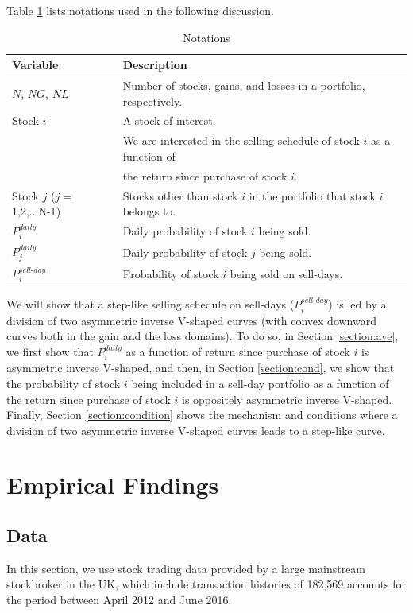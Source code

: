 \documentclass[11pt, a4paper]{article}
\begin{document}
Table \ref{table:notations} lists notations used in the following discussion.

\begin{table}[H]
	\label{table:notations}
	\caption{Notations}
	\centering
	\small
	\begin{tabular}{l l} 
		\hline
		Variable &\:\:\:\:\:\:\:\:\:\:\:\: Description \\
		\hline
		$N$, $NG$, $NL$ & Number of stocks, gains, and losses in a portfolio, respectively.\\
		Stock $i$ & A stock of interest. \\
		& We are interested in the selling schedule of stock $i$ as a function of\\
		& the return since purchase of stock $i$.\\
		Stock $j$ ($j=${1,2,...N-1})& Stocks other than stock $i$ in the portfolio that stock $i$ belongs to.\\
		$P^{daily}_{i}$ & Daily probability of stock $i$ being sold. \\
		$P^{daily}_{j}$ & Daily probability of stock $j$ being sold. \\
		$P^{sell\mbox{-}day}_{i}$ & Probability of stock $i$ being sold on sell-days.\\
		\hline
	\end{tabular}
\end{table}

We will show that a step-like selling schedule on sell-days ($P^{sell\mbox{-}day}_{i}$) is led by a division of two asymmetric inverse V-shaped curves (with convex downward curves both in the gain and the loss domains). To do so, in Section \ref{section:ave}, we first show that $P^{daily}_{i}$ as a function of return since purchase of stock $i$ is asymmetric inverse V-shaped, and then, in Section \ref{section:cond}, we show that the probability of stock $i$ being included in a sell-day portfolio as a function of the return since purchase of stock $i$ is oppositely asymmetric inverse V-shaped. Finally, Section \ref{section:condition} shows the mechanism and conditions where a division of two asymmetric inverse V-shaped curves leads to a step-like curve. 

\section{Empirical Findings}
\subsection{Data}
In this section, we use stock trading data provided by a large mainstream stockbroker in the UK, which include transaction histories of 182,569 accounts for the period between April 2012 and June 2016. 
\end{document}
